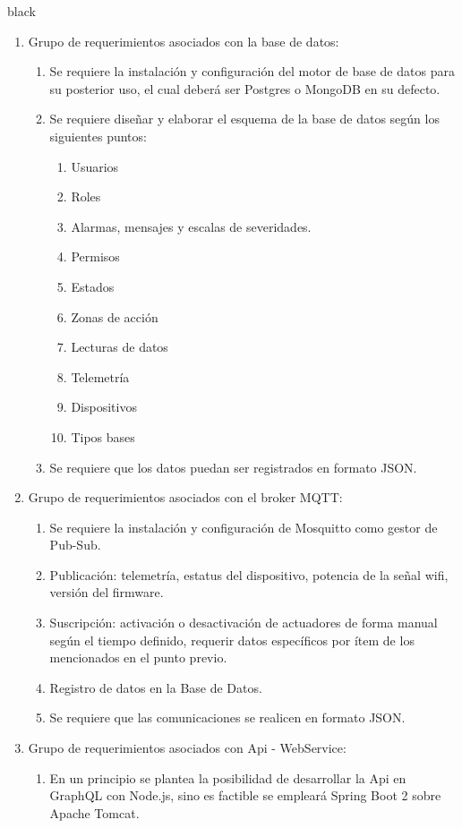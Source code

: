 \documentclass[11pt]{charter}
\begin{document}
\begin{consigna}{black}
\begin{enumerate}
\begin{enumerate}
	\end{enumerate}
\item Grupo de requerimientos asociados con la base de datos:
	\begin{enumerate}
		\item Se requiere la instalación y configuración del motor de base de datos para su posterior uso, el cual deberá ser Postgres o MongoDB en su defecto.\newpage
		\item Se requiere diseñar y elaborar el esquema de la base de datos según los siguientes puntos:
			\begin{enumerate}
				\item Usuarios
				\item Roles
				\item Alarmas, mensajes y escalas de severidades.
				\item Permisos
				\item Estados
				\item Zonas de acción
				\item Lecturas de datos
				\item Telemetría
				\item Dispositivos
				\item Tipos bases
			\end{enumerate}
		\item Se requiere que los datos puedan ser registrados en formato JSON.
	\end{enumerate}
\item Grupo de requerimientos asociados con el broker MQTT:
	\begin{enumerate}
		\item Se requiere la instalación y configuración de Mosquitto como gestor de Pub-Sub.
		\item Publicación: telemetría, estatus del dispositivo, potencia de la señal wifi, versión del firmware.
		\item Suscripción: activación o desactivación de actuadores de forma manual según el tiempo definido, requerir datos específicos por ítem de los mencionados en el punto previo.
		\item Registro de datos en la Base de Datos.
		\item Se requiere que las comunicaciones se realicen en formato JSON.
	\end{enumerate}	
\item Grupo de requerimientos asociados con Api - WebService:
	\begin{enumerate}
		\item En un principio se plantea la posibilidad de desarrollar la Api en GraphQL con Node.js, sino es factible se empleará Spring Boot 2 sobre Apache Tomcat.

\end{enumerate}
\end{enumerate}
\end{consigna}
\end{document}

